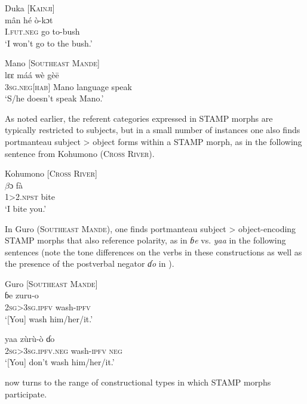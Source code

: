 \documentclass[output=paper]{langsci/langscibook}
\begin{document}
\ea\label{ex:anderson:6}
Duka  \citep[13]{BendorSamuelEtAl1973}      [\textsc{Kainji}]\\
\gll mân  hé  ò-kɔt  \\
\textsc{I.fut.neg}  go  to-bush\\
\glt `I won't go to the bush.'      
\z

\ea\label{ex:anderson:7}
Mano \citep[226]{Vydrine2009}           [\textsc{Southeast Mande}]\\
\gll lɛɛ      máá    wè    gè\={e}\\
\textsc{3sg.neg[hab]}  Mano    language  speak\\
\glt `S/he doesn't speak Mano.'
\z

As noted earlier, the referent categories expressed in STAMP morphs are typically restricted to subjects, but in a small number of instances one also finds portmanteau subject > object forms within a STAMP morph, as in the following sentence from Kohumono (\textsc{Cross River}).

\ea\label{ex:anderson:8}
 Kohumono \citep[355]{Cook1972}         [\textsc{Cross River}]\\
\gll $\beta ɔ$    fà\\
1>2.\textsc{npst}  bite\\
\glt `I bite you.'
\z

In Guro (\textsc{Southeast Mande}), one finds portmanteau subject > object-encoding STAMP morphs that also reference polarity, as in \textit{ɓ}\textit{e} vs. \textit{yaa} in the following sentences (note the tone differences on the verbs in these constructions as well as the presence of the postverbal negator \textit{ɗ}\textit{o} in ). 

\ea\label{ex:anderson:9}
\ea\label{ex:anderson:9a}
Guro \citep[239]{Vydrine2009}       [\textsc{Southeast} \textsc{Mande}]\\
\gll  ɓe      zuru-o      \\
  \textsc{2sg>3sg.ipfv}    wash-\textsc{ipfv} \\
\glt `[You] wash him/her/it.'       

\ex \label{ex:anderson:9b}
\gll  yaa      zùrù-ò    ɗo\\
  \textsc{2sg>3sg.ipfv.neg}  wash-\textsc{ipfv}  \textsc{neg}\\
\glt `[You] don't wash him/her/it.'
\z
\z

 now turns to the range of constructional types in which STAMP morphs participate.
\end{document}
